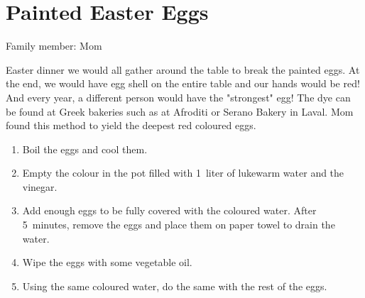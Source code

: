 \chapter{Painted Easter Eggs}
\label{ch:eastereggs}


Family member: Mom


 Easter dinner we would all gather around the table to break the painted eggs. At the end, we would have egg shell on the entire table and our hands would be red! And every year, a different person would have the "strongest" egg!     The dye can be found at Greek bakeries such as at Afroditi or Serano Bakery in Laval. Mom found this method to yield the deepest red coloured eggs.

\begin{enumerate}
    \item Boil the eggs and cool them.
    \item Empty the colour in the pot filled with 1~liter of lukewarm water and the vinegar.
    \item Add enough eggs to be fully covered with the coloured water. After 5~minutes, remove the eggs and place them on paper towel to drain the water.
    \item Wipe the eggs with some vegetable oil.
    \item Using the same coloured water, do the same with the rest of the eggs.
\end{enumerate}

